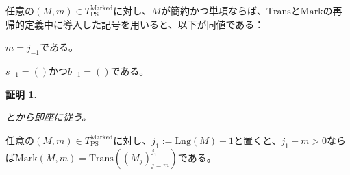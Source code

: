 \documentclass[dvipdfmx,uplatex]{jsarticle}
\theoremstyle{customnonumberbreakfortheorem}
\theoremstyle{customnonumberbreakforproof}
\newtheorem{hideableproof}{証明}
\begin{document}
\begin{corollary}[\(s_{-1}\)と\(b_{-1}\)の空性と基点の関係]\label{s_-1とb_-1の空性と基点の関係}
	任意の\((M,m) \in T_{\textrm{PS}}^{\textrm{Marked}}\)に対し、\(M\)が簡約かつ単項ならば、\(\textrm{Trans}\)と\(\textrm{Mark}\)の再帰的定義中に導入した記号を用いると、以下が同値である：
	\begin{penumerate}
		\item \(m = j_{-1}\)である。
		\item \(s_{-1} = ()\)かつ\(b_{-1} = ()\)である。
	\end{penumerate}
\end{corollary}

\begin{hideableproof}
	\begin{indented}
		\item {}とから即座に従う。
	\end{indented}
\end{hideableproof}

\begin{proposition}\label{MarkのTransによる表示}
	任意の\((M,m) \in T_{\textrm{PS}}^{\textrm{Marked}}\)に対し、\(j_1 := \textrm{Lng}(M)-1\)と置くと、\(j_1 - m > 0\)ならば\(\textrm{Mark}(M,m) = \textrm{Trans}((M_j)_{j=m}^{j_1})\)である。
\end{proposition}
\end{document}
